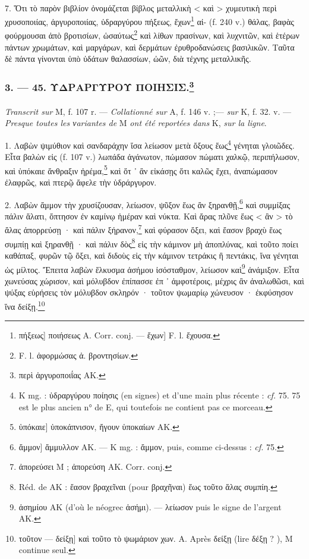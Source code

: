 \documentclass[a4paper, 11pt, oneside, polutonikogreek, french]{article}
\begin{document}
\paragraph{}
7. Ὅτι τὸ παρὸν βιβλίον ὀνομάζεται βίβλος μεταλλικὴ < καὶ > χυμευτικὴ περὶ χρυσοποιίας, ἀργυροποιίας, ὑδραργύρου πήξεως, ἔχων\footnote{πήξεως] ποιήσεως A. Corr. conj. --- ἔχων] F. l. ἔχουσα.} αἰ- (f. 240 v.) θάλας, βαφὰς φούρμουσαι ἀπὸ βροτισίων, ὡσαύτως\footnote{F. l. ἀφορμώσας ἀ. βροντησίων.} καὶ λίθων πρασίνων, καὶ λυχνιτῶν, καὶ ἑτέρων πάντων χρωμάτων, καὶ μαργάρων, καὶ δερμάτων ἐρυθροδανώσεις βασιλικῶν. Ταῦτα δὲ πάντα γίνονται ὑπὸ ὑδάτων θαλασσίων, ὠῶν, διὰ τέχνης μεταλλικῆς.

\bigskip
\centerline{\EightStarTaper}
\centerline{\EightStarTaper\EightStarTaper}
\bigskip

\subsubsection[3. --- 45. ΥΔΡΑΡΓΥΡΟΥ ΠΟΙΗΣΙΣ.]{3. --- 45. ΥΔΡΑΡΓΥΡΟΥ ΠΟΙΗΣΙΣ.\footnote{περὶ ἀργυροποιΐας AK.}}
\paragraph{}
\emph{Transcrit sur} M, f. 107 r. --- \emph{Collationné sur} A, f. 146 v. ;--- \emph{sur} K, f. 32. v. --- \emph{Presque toutes les νariantes de} M \emph{ont été reportées dans} K, \emph{sur la ligne}.

\bigskip

1. Λαβὼν ψιμύθιον καὶ σανδαράχην ἴσα λείωσον μετὰ ὄξους ἕως\footnote{K mg. : ὑδραργύρου ποίησις (en signes) et d'une main plus récente : \emph{cf.} 75. 75 est le plus ancien n° de E, qui toutefois ne contient pas ce morceau.} γένηται γλοιῶδες. Εἶτα βαλὼν εἰς (f. 107 v.) λωπάδα ἀγάνωτον, πώμασον πώματι χαλκῷ, περιπήλωσον, καὶ ὑπόκαιε ἄνθραξιν ἠρέμα,\footnote{ὑπόκαιε] ὑποκάπνισον, ἤγουν ὑποκαίων AK.} καὶ ὅτ ᾽ ἂν εἰκάσῃς ὅτι καλῶς ἔχει, ἀναπώμασον ἐλαφρῶς, καὶ πτερῷ ἄφελε τὴν ὑδράργυρον.

2. Λαβὼν ἄμμον τὴν χρυσίζουσαν, λείωσον, ψῦξον ἕως ἂν ξηρανθῇ,\footnote{ἄμμον] ἄμμυλλον AK. --- K mg. : ἄμμον, puis, comme ci-dessus : \emph{cf.} 75.} καὶ συμμίξας πάλιν ἅλατι, ὄπτησον ἐν καμίνῳ ἡμέραν καὶ νύκτα. Καὶ ἄρας πλῦνε ἕως < ἂν > τὸ ἄλας ἀπορρεύσῃ · καὶ πάλιν ξήρανον,\footnote{ἀπορεύσει M ; ἀπορεύση AK. Corr. conj.} καὶ φύρασον ὄξει, καὶ ἔασον βραχὺ ἕως συμπίῃ καὶ ξηρανθῇ · καὶ πάλιν δὸς\footnote{Réd. de AK : ἔασον βραχεῖναι (pour βραχῆναι) ἕως τοῦτο ἅλας συμπίη.} εἰς τὴν κάμινον μὴ ἀποπλύνας, καὶ τοῦτο ποίει καθάπαξ, φυρῶν τῷ ὄξει, καὶ διδοὺς εἰς τὴν κάμινον τετράκις ἢ πεντάκις, ἵνα γένηται ὡς μίλτος. Ἔπειτα λαβὼν ἕλκυσμα ἀσήμου ἰσόσταθμον, λείωσον καὶ\footnote{ἀσημίου AK (d'où le néogrec ἀσήμι). --- λείωσον puis le signe de l'argent AK.} ἀνάμιξον. Εἶτα χωνεύσας χώρισον, καὶ μόλυβδον ἐπίπασσε ἐπ ᾽ ἀμφοτέροις, μέχρις ἂν ἀναλωθῶσι, καὶ ψύξας εὑρήσεις τὸν μόλυβδον σκληρόν · τοῦτον ψωμαρίῳ χώνευσον · ἐκφύσησον ἵνα δείξῃ.\footnote{τοῦτον --- δείξῃ] καὶ τοῦτο τὸ ψωμάριον χων. A. Après δείξῃ (lire δέξῃ ? ), M continue seul.}
\end{document}
